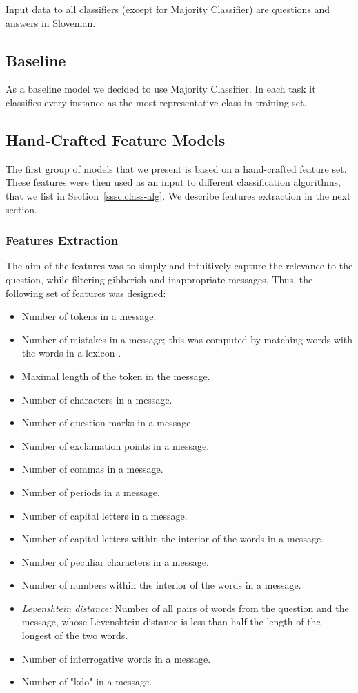 \documentclass[11pt,a4paper]{article}
\begin{document}
Input data to all classifiers (except for Majority Classifier) are questions and answers in Slovenian.

\subsection{Baseline}
As a baseline model we decided to use Majority Classifier. In each task it classifies every instance as the most representative class in training set.

\subsection{Hand-Crafted Feature Models}
The first group of models that we present is based on a hand-crafted feature set. These features were then used as an input to different classification algorithms, that we list in Section~\ref{sssc:class-alg}. We describe features extraction in the next section.

\subsubsection{Features Extraction}
The aim of the features was to simply and intuitively capture the relevance to the question, while filtering gibberish and inappropriate messages. Thus, the following set of features was designed:

\begin{itemize}
     \item Number of tokens in a message.
     \item Number of mistakes in a message; this was computed by matching words with the words in a lexicon \cite{11356/1230}.
     \item Maximal length of the token in the message.
     \item Number of characters in a message.
     \item Number of question marks in a message.
     \item Number of exclamation points in a message.
     \item Number of commas in a message.
     \item Number of periods in a message.
     \item Number of capital letters in a message.
     \item Number of capital letters within the interior of the words  in a message.
     \item Number of peculiar characters in a message.
     \item Number of numbers within the interior of the words in a message.
     \item \textit{Levenshtein distance:} Number of all pairs of words from the question and the message, whose Levenshtein distance is less than half the length of the longest of the two words.
     \item Number of interrogative words in a message.
     \item Number of "kdo" in a message.
\end{itemize}
\end{document}
